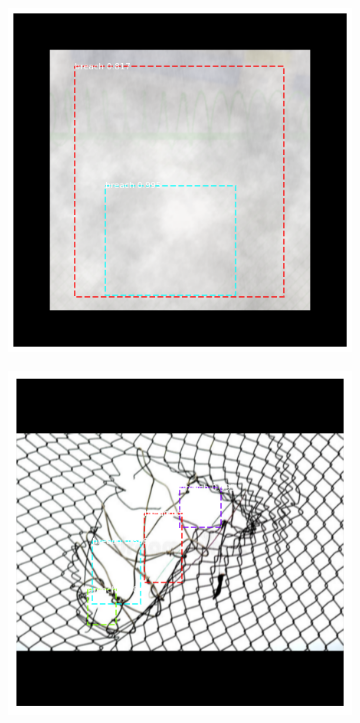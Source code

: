 \documentclass[../Head/Main.tex]{subfiles}
\begin{document}
\begin{figure}[H]
\begin{subfigure}{.23\textwidth}
        \includegraphics[width=\textwidth]{../Figures/rcnn_results/found_breaches/bad_performance/11.png}
        \caption{}
    \end{subfigure}
    \hfill
    \begin{subfigure}{.23\textwidth}
        \centering
        \includegraphics[width=\textwidth]{../Figures/rcnn_results/found_breaches/bad_performance/3.png}

\end{subfigure}
\end{figure}
\end{document}
